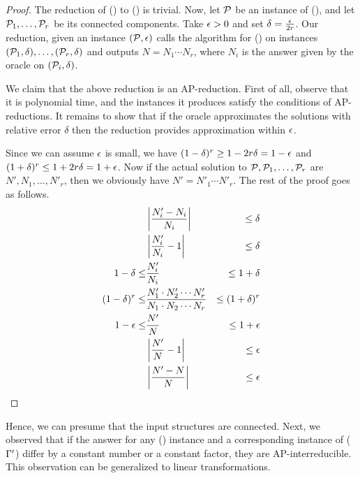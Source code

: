 \begin{proof}
The reduction of \cccsp(\mrelset) to \ccsp(\mrelset) is trivial. Now, let \(\mathcal{P}\) be an instance of
\ccsp(\mrelset), and let \(\mathcal{P}_1,\dotsc,\mathcal{P}_r\) be its connected components. Take \(\epsilon > 0\) 
and set \(\delta = \frac{\epsilon}{2r}\)\@. Our reduction, given an instance \((\mathcal{P},\epsilon)\) calls
the algorithm for \cccsp(\mrelset) on instances \((\mathcal{P}_1,\delta), \dotsc,(\mathcal{P}_r,\delta)\) 
and outputs \(N = N_1 \dotsm N_r\),
where \(N_i\) is the answer given by the oracle on \((\mathcal{P}_i,\delta)\)\@.

We claim that the above reduction is an AP-reduction. First of all, observe that it is polynomial
time, and the instances it produces satisfy the conditions of AP-reductions. It remains to show
that if the oracle approximates the solutions with relative error \(\delta\) then the reduction 
provides approximation within \(\epsilon\)\@.

Since we can assume \(\epsilon\) is small, we have \((1 - \delta)^r \ge 1 - 2r\delta = 1 - \epsilon \) and
\( ( 1 + \delta)^r \le 1 + 2r\delta = 1 + \epsilon\)\@. Now if 
the actual solution to \(\mathcal{P}, \mathcal{P}_1,\dotsc,\mathcal{P}_r\) are \(N',N_1,\dotsc,N'_r\), then 
we obviously have \(N'=N'_1\dotsm N'_r\)\@. The rest of the proof goes as follows.
\begin{eqnarray*}
&\left|\frac{N'_i - N_i}{N_i}\right| &\le \delta \\
&\left|\frac{N'_i}{N_i} -1 \right| &\le \delta \\
1 - \delta  \le &\frac{N'_i}{N_i} &\le 1 + \delta \\
(1-\delta)^r \le &\frac{N'_1\cdot N'_2 \dotsm N'_r}{N_1\cdot N_2 \dotsm N_r} &\le (1 + \delta)^r \\
1-\epsilon \le &\frac{N'}{N} &\le 1+\epsilon \\
&\left|\frac{N'}{N}-1\right|&\le \epsilon\\
&\left|\frac{N'-N}{N}\right|&\le \epsilon\\
\end{eqnarray*}
\end{proof}
Hence, we can presume that the input structures are connected.
Next, we observed that if the answer for any \ccsp(\mrelset) instance and a corresponding
instance of \ccsp(\(\Gamma'\)) differ by a constant number or a constant factor,
they are AP-interreducible. This observation can be generalized
to linear transformations. 

